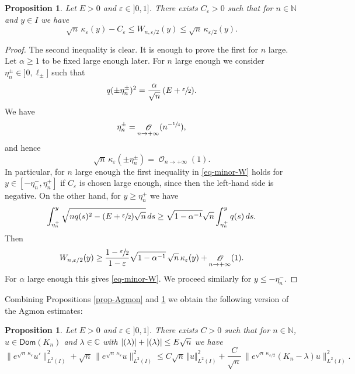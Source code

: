 \documentclass[JEP,XML,SOM,Unicode]{cedram}
\let\mathcal\mathscr
\theoremstyle{plain}
\newtheorem{proposition}[theorem]{Proposition}
\theoremstyle{definition}
\newcommand{\abs}[1]{\vert #1\vert}
\newcommand{\nr}[1]{\Vert #1\Vert}
\newcommand{\inv}{^{-1}}
\newcommand{\1}{\mathds 1}
\let\Re\relax
\DeclareMathOperator{\Re}{\mathsf{Re}\mkern2mu}
\let\Im\relax
\DeclareMathOperator{\Im}{\mathsf{Im}\mkern2mu}
\newcommand{\Dom}{\mathsf{Dom}}
\def\C{\mathbb{C}}
\newcommand{\N}{\mathbb{N}}
\let\a\alpha
\let\e\varepsilon
\let\k\kappa
\let\l\lambda
\newcommand{\Oc}{{\mathcal O}}
\begin{document}
\begin{proposition} \label{prop-W}
Let $E > 0$ and $\e \in{}]0,1]$. There exists $C_\e > 0$ such that for $n \in \N$ and $y \in I$ we have
\begin{equation} \label{eq-minor-W}
\sqrt n\,\kappa_\e (y) - C_\e \leq W_{n,\e/2}(y) \leq \sqrt n\,\kappa_{\e/2}(y) .
\end{equation}
\end{proposition}

\begin{proof}
The second inequality is clear. It is enough to prove the first for $n$ large. Let $\a \geq 1$ to be fixed large enough later. For $n$ large enough we consider $\eta_n^\pm \in{}]0,\ell_\pm]$ such that
\[
q(\pm \eta_n^\pm)^2 = \frac {\a}{\sqrt n}\,(E+ \sfrac \e 2).
\]
We have
\[
\eta_n^\pm = \mathop{\Oc}_{n \to +\infty}(n^{-\sfrac 14}),
\]
and hence
\begin{equation*}
\sqrt n\,\kappa_\e(\pm \eta_n^\pm) = \mathop{\Oc}_{n \to +\infty} (1).
\end{equation*}
In particular, for $n$ large enough the first inequality in \eqref{eq-minor-W} holds for $y \in [-\eta_n^-,\eta_n^+]$ if $C_\e$ is chosen large enough, since then the left-hand side is negative. On the other hand, for $y \geq \eta_n^+$ we have
\begin{align*}
\int_{\eta_n^+}^{y} \sqrt{nq(s)^2 -(E+\sfrac \e 2)\sqrt n} \, ds \geq \sqrt{1-\a \inv } \sqrt n \int_{\eta_n^+}^y q(s) \, ds.
\end{align*}
Then
\[
W_{n,\e/2}(y)
\geq \frac {1-\sfrac \e 2}{1 - \e} \sqrt{1-\a \inv }\, \sqrt n\,\kappa_\e(y) + \mathop{\Oc}_{n \to +\infty} (1).
\]
For $\a$ large enough this gives \eqref{eq-minor-W}. We proceed similarly for $y \leq -\eta_n^-$.
\end{proof}

Combining Propositions \ref{prop-Agmon} and \ref{prop-W} we obtain the following version of the Agmon estimates:

\begin{proposition} \label{prop-psi-L2}
Let $E > 0$ and $\e \in{}]0,1]$. There exists $C > 0$ such that for $n \in \N$, $u \in \Dom(K_n)$ and $\l \in \C$ with $\abs{\Re(\l)} + \abs{\Im(\l)} \leq E \sqrt n$ we have
\begin{equation*}
\big\|e^{\sqrt n\,\kappa_\e} u'\big\|_{L^2(I)}^2 + \sqrt n\,\big\|e^{\sqrt n\,\kappa_\e} u\big\|_{L^2(I)}^2
\leq C \sqrt n\,\nr{u}_{L^2(I)}^2 + \frac {C}{\sqrt n}\, \bigl\|e^{\sqrt n\,\k_{\e/2}} (K_n-\l)u\bigr\|_{L^2(I)}^2.
\end{equation*}
\end{proposition}
\end{document}
